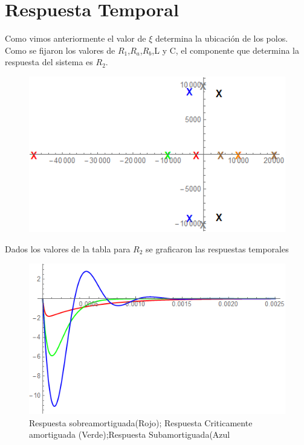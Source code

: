 \documentclass[10pt,a4paper]{article} %
\begin{document}
\section{Respuesta Temporal}
Como vimos anteriormente el valor de $\xi$ determina la ubicación de los polos. Como se fijaron los valores de $R_1$,$R_a$,$R_b$,L y C, el componente que determina la respuesta del sistema es $R_2$.
\begin{figure}[H]
\begin{center}
	\includegraphics[scale=0.6]{polos1}
\end{center}
\end{figure}
Dados los valores de la tabla para $R_2$ se graficaron las respuestas temporales
\begin{figure}[H]
\begin{center}
		\includegraphics[scale=0.5]{respuestatemporal1}
\end{center}
	\caption{Respuesta sobreamortiguada(Rojo); Respuesta Criticamente amortiguada (Verde);Respuesta Subamortiguada(Azul}
\end{figure}
\end{document}
